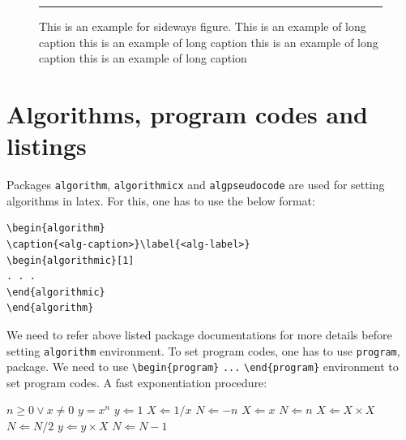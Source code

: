 \documentclass[unnumsec,webpdf,contemporary,large]{oup-authoring-template}%
\theoremstyle{thmstyleone}%
\theoremstyle{thmstyletwo}%
\theoremstyle{thmstylethree}%
\begin{document}
\begin{figure}%
\centering
{\color{black!20}\rule{610pt}{102pt}}
\caption{This is an example for sideways figure. This is an example of long caption this is an example of long caption  this is an example of long caption this is an example of long caption}\label{fig3}
\end{figure}



\section{Algorithms, program codes and listings}\label{sec7}

Packages \verb+algorithm+, \verb+algorithmicx+ and \verb+algpseudocode+ are used for setting algorithms in latex.
For this, one has to use the below format:


\begin{verbatim}
\begin{algorithm}
\caption{<alg-caption>}\label{<alg-label>}
\begin{algorithmic}[1]
. . .
\end{algorithmic}
\end{algorithm}
\end{verbatim}


We need to refer above listed package documentations for more details before setting \verb+algorithm+ environment.
To set program codes, one has to use \verb+program+, package. We need to use \verb+\begin{program}+ \verb+...+
\verb+\end{program}+ environment to set program codes. A fast exponentiation procedure:

\begin{algorithm}[!t]
\caption{Calculate $y = x^n$}\label{algo1}
\begin{algorithmic}[1]
\Require $n \geq 0 \vee x \neq 0$
\Ensure $y = x^n$
\State $y \Leftarrow 1$
        \State $X \Leftarrow 1 / x$
        \State $N \Leftarrow -n$
\Else
        \State $X \Leftarrow x$
        \State $N \Leftarrow n$
\EndIf
{}
            \State $X \Leftarrow X \times X$
            \State $N \Leftarrow N / 2$
        \Else[$N$ is odd]
            \State $y \Leftarrow y \times X$
            \State $N \Leftarrow N - 1$
        \EndIf
\EndWhile
\end{algorithmic}
\end{algorithm}
\end{document}
